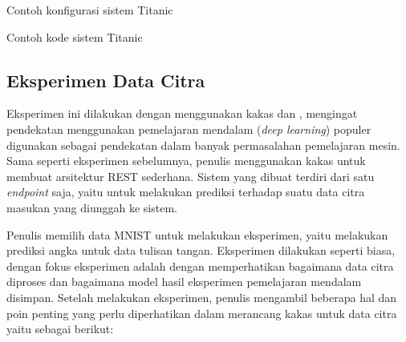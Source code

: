 \begin{code}
	\caption{Contoh konfigurasi sistem Titanic}\label{listing:14}
\end{code}

\begin{code}
	\caption{Contoh kode sistem Titanic}\label{listing:15}
\end{code}

\subsection{Eksperimen Data Citra}\label{section:03-image-experiment}

Eksperimen ini dilakukan dengan menggunakan kakas  dan , mengingat pendekatan menggunakan pemelajaran mendalam (\textit{deep learning}) populer digunakan sebagai pendekatan dalam banyak permasalahan pemelajaran mesin.
Sama seperti eksperimen sebelumnya, penulis menggunakan kakas  untuk membuat arsitektur REST sederhana.
Sistem yang dibuat terdiri dari satu \textit{endpoint} saja, yaitu untuk melakukan prediksi terhadap suatu data citra masukan yang diunggah ke sistem.

Penulis memilih data MNIST untuk melakukan eksperimen, yaitu melakukan prediksi angka untuk data tulisan tangan.
Eksperimen dilakukan seperti biasa, dengan fokus eksperimen adalah dengan memperhatikan bagaimana data citra diproses dan bagaimana model hasil eksperimen pemelajaran mendalam disimpan.
Setelah melakukan eksperimen, penulis mengambil beberapa hal dan poin penting yang perlu diperhatikan dalam merancang kakas untuk data citra yaitu sebagai berikut:

